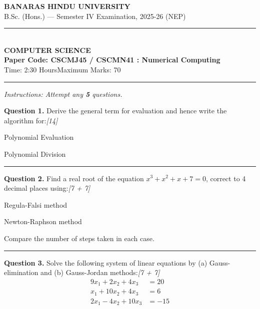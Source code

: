\documentclass[11pt,a4paper]{article}
\newcommand{\pts}[1]{\hfill   \textit{[#1]}}
\begin{document}
\begin{center}
  {\large\bfseries BANARAS HINDU UNIVERSITY}\\[2pt]
  {\normalsize B.Sc. (Hons.) --- Semester IV Examination, 2025-26 (NEP)}\\[6pt]
  \rule{0.8\linewidth}{0.5pt}\\[6pt]
  {\large\bfseries COMPUTER SCIENCE}\\[4pt]
  {\large\bfseries Paper Code: CSCMJ45 / CSCMN41 : Numerical Computing}\\[4pt]
  {\normalsize Time: 2:30 Hours\hfill Maximum Marks: 70}
\end{center}

\rule{\linewidth}{0.4pt}

\smallskip



\noindent   \textit{Instructions: Attempt any   \textbf{5} questions.}

\bigskip




\noindent   \textbf{Question 1.} Derive the general term for evaluation and hence write the algorithm for:\pts{14}

\begin{parts}
  \item Polynomial Evaluation
  \item Polynomial Division
\end{parts}

\medskip\rule{\linewidth}{0.2pt}\medskip




\noindent   \textbf{Question 2.} Find a real root of the equation $x^3 + x^2 + x + 7 = 0$, correct to 4 decimal places using:\pts{7 + 7}

\begin{parts}
  \item Regula-Falsi method
  \item Newton-Raphson method
\end{parts}



\noindent Compare the number of steps taken in each case.

\medskip\rule{\linewidth}{0.2pt}\medskip




\noindent   \textbf{Question 3.} Solve the following system of linear equations by (a) Gauss-elimination and (b) Gauss-Jordan methods:\pts{7 + 7}
\[
  
\begin{aligned}
    9x_1 + 2x_2 + 4x_3 &= 20 \\
    x_1 + 10x_2 + 4x_3 &= 6 \\
    2x_1 - 4x_2 + 10x_3 &= -15
  \end{aligned}
\]
\end{document}
